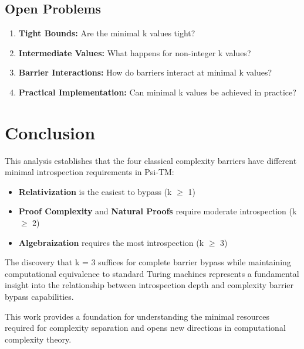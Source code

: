 \documentclass[11pt]{article}
\begin{document}
\subsection{Open Problems}

\begin{enumerate}
\item \textbf{Tight Bounds:} Are the minimal k values tight?
\item \textbf{Intermediate Values:} What happens for non-integer k values?
\item \textbf{Barrier Interactions:} How do barriers interact at minimal k values?
\item \textbf{Practical Implementation:} Can minimal k values be achieved in practice?
\end{enumerate}

\section{Conclusion}

This analysis establishes that the four classical complexity barriers have different minimal introspection requirements in Psi-TM:

\begin{itemize}
\item \textbf{Relativization} is the easiest to bypass (k $\geq$ 1)
\item \textbf{Proof Complexity} and \textbf{Natural Proofs} require moderate introspection (k $\geq$ 2)
\item \textbf{Algebraization} requires the most introspection (k $\geq$ 3)
\end{itemize}

The discovery that k = 3 suffices for complete barrier bypass while maintaining computational equivalence to standard Turing machines represents a fundamental insight into the relationship between introspection depth and complexity barrier bypass capabilities.

This work provides a foundation for understanding the minimal resources required for complexity separation and opens new directions in computational complexity theory.
\end{document}

